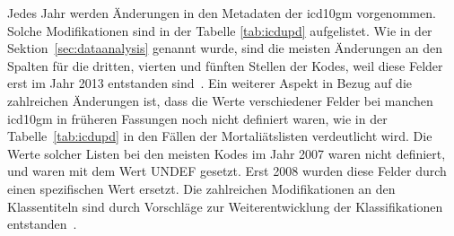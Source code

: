 Jedes Jahr werden Änderungen in den Metadaten der \ac{icd10gm} vorgenommen. Solche Modifikationen sind in der Tabelle \ref{tab:icdupd} aufgelistet. Wie in der Sektion~\ref{sec:dataanalysis} genannt wurde, sind die meisten Änderungen an den Spalten für die dritten, vierten und fünften Stellen  der Kodes, weil diese Felder erst im Jahr 2013 entstanden sind~\cite{readme13}. Ein weiterer Aspekt in Bezug auf die zahlreichen Änderungen ist, dass die Werte verschiedener Felder bei manchen \ac{icd10gm} in früheren Fassungen noch nicht definiert waren, wie in der Tabelle~\ref{tab:icdupd} in den Fällen der Mortaliätslisten verdeutlicht wird. Die Werte solcher Listen bei den meisten Kodes im Jahr 2007 waren nicht definiert, und waren mit dem Wert \glqq\textsf{UNDEF}\grqq{} gesetzt. Erst 2008 wurden diese Felder durch einen spezifischen Wert ersetzt. Die zahlreichen Modifikationen an den Klassentiteln sind durch Vorschläge zur Weiterentwicklung der Klassifikationen entstanden~\cite{diab09, komm14}. 


